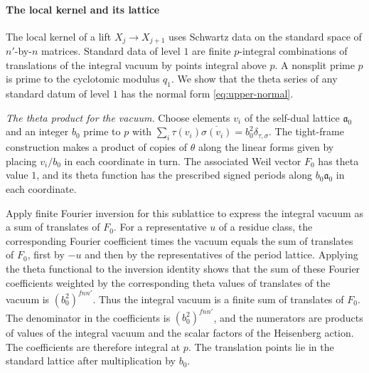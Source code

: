 \paragraph{The local kernel and its lattice}
The local kernel of a lift \(X_j\to X_{j+1}\) uses Schwartz data on
the standard space of \(n'\)-by-\(n\) matrices.
Standard data of level \(1\) are finite \(p\)-integral combinations
of translations of the integral vacuum by points integral above \(p\).
A nonsplit prime \(p\) is prime to the cyclotomic modulus \(q_1\).
We show that the theta series of any standard datum of level \(1\)
has the normal form \eqref{eq:upper-normal}.

\emph{The theta product for the vacuum.}
Choose elements \(v_i\) of the self-dual lattice \(\mathfrak a_0\) and an
integer \(b_0\) prime to \(p\) with
\(\sum_i \tau(v_i)\overline{\sigma(v_i)}=b_0^2\delta_{\tau,\sigma}\).
The tight-frame construction makes a product of copies of \(\theta\)
along the linear forms given by placing \(v_i/b_0\) in each coordinate
in turn. The associated Weil vector \(F_0\) has theta value \(1\),
and its theta function has the prescribed signed periods along
\(b_0\mathfrak a_0\) in each coordinate.

Apply finite Fourier inversion for this sublattice to express the
integral vacuum as a sum of translates of \(F_0\).
For a representative \(u\) of a residue class, the corresponding
Fourier coefficient times the vacuum equals the sum of translates
of \(F_0\), first by \(-u\) and then by the representatives of the
period lattice. Applying the theta functional to the inversion
identity shows that the sum of these Fourier coefficients weighted
by the corresponding theta values of translates of the vacuum is
\((b_0^2)^{f n n'}\). Thus the integral vacuum is a finite sum of
translates of \(F_0\). The denominator in the coefficients is
\((b_0^2)^{f n n'}\), and the numerators are products of values of the
integral vacuum and the scalar factors of the Heisenberg action.
The coefficients are therefore integral at \(p\).
The translation points lie in the standard lattice after
multiplication by \(b_0\).

